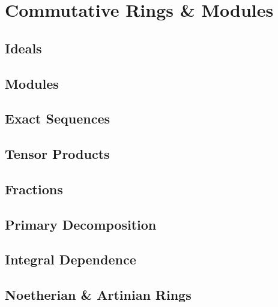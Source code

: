 \chapter{Commutative Rings \& Modules}

\section{Ideals}

\section{Modules}

\section{Exact Sequences}

\section{Tensor Products}

\section{Fractions}

\section{Primary Decomposition}

\section{Integral Dependence}

\section{Noetherian \& Artinian Rings}

